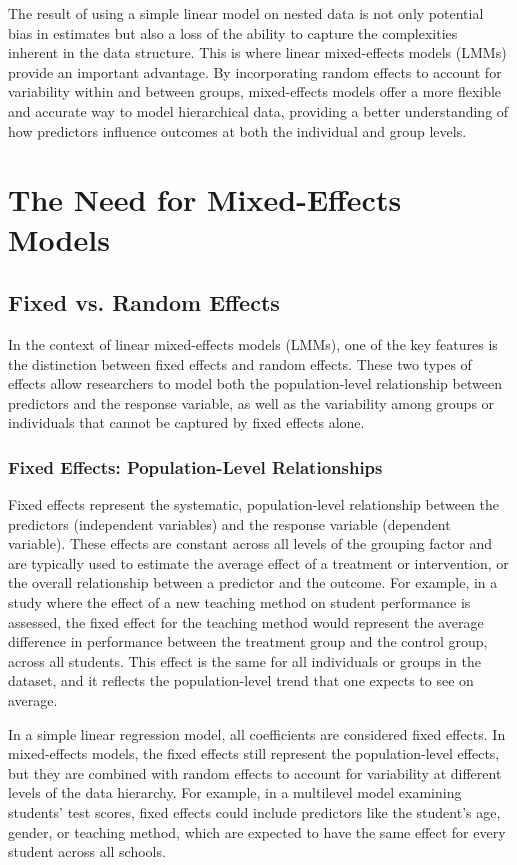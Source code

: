 The result of using a simple linear model on nested data is not only potential bias in estimates but also a loss of the ability to capture the complexities inherent in the data structure. This is where linear mixed-effects models (LMMs) provide an important advantage. By incorporating random effects to account for variability within and between groups, mixed-effects models offer a more flexible and accurate way to model hierarchical data, providing a better understanding of how predictors influence outcomes at both the individual and group levels.

\section{The Need for Mixed-Effects Models}
\subsection*{Fixed vs. Random Effects}
In the context of linear mixed-effects models (LMMs), one of the key features is the distinction between fixed effects and random effects. These two types of effects allow researchers to model both the population-level relationship between predictors and the response variable, as well as the variability among groups or individuals that cannot be captured by fixed effects alone.

\subsubsection{Fixed Effects: Population-Level Relationships}
Fixed effects represent the systematic, population-level relationship between the predictors (independent variables) and the response variable (dependent variable). These effects are constant across all levels of the grouping factor and are typically used to estimate the average effect of a treatment or intervention, or the overall relationship between a predictor and the outcome. For example, in a study where the effect of a new teaching method on student performance is assessed, the fixed effect for the teaching method would represent the average difference in performance between the treatment group and the control group, across all students. This effect is the same for all individuals or groups in the dataset, and it reflects the population-level trend that one expects to see on average.

In a simple linear regression model, all coefficients are considered fixed effects. In mixed-effects models, the fixed effects still represent the population-level effects, but they are combined with random effects to account for variability at different levels of the data hierarchy. For example, in a multilevel model examining students' test scores, fixed effects could include predictors like the student's age, gender, or teaching method, which are expected to have the same effect for every student across all schools.

